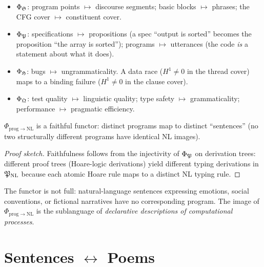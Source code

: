\begin{construction}
\label{con:prog-nl}
\begin{itemize}[nosep]
  \item $\Phi_{\mathfrak{S}}$: program points $\mapsto$ discourse segments;
    basic blocks $\mapsto$ phrases; the CFG cover $\mapsto$ constituent
    cover.
  \item $\Phi_{\mathfrak{P}}$: specifications $\mapsto$ propositions
    (a spec ``output is sorted'' becomes the proposition ``the
    array is sorted''); programs $\mapsto$ utterances (the code
    \emph{is} a statement about what it does).
  \item $\Phi_{\mathfrak{H}}$: bugs $\mapsto$ ungrammaticality.
    A data race ($H^1\neq 0$ in the thread cover) maps to a
    binding failure ($H^1\neq 0$ in the clause cover).
  \item $\Phi_{\mathfrak{Q}}$: test quality $\mapsto$ linguistic quality;
    type safety $\mapsto$ grammaticality;
    performance $\mapsto$ pragmatic efficiency.
\end{itemize}
\end{construction}

\begin{theorem}[Faithfulness]
\label{thm:prog-nl-faithful}
$\Phi_{\mathrm{prog}\to\mathrm{NL}}$ is a faithful functor:
distinct programs map to distinct ``sentences'' (no two
structurally different programs have identical NL images).
\end{theorem}

\begin{proof}[Proof sketch]
Faithfulness follows from the injectivity of $\Phi_{\mathfrak{P}}$ on
derivation trees: different proof trees (Hoare-logic derivations)
yield different typing derivations in $\mathfrak{P}_{\mathrm{NL}}$
because each atomic Hoare rule maps to a distinct NL typing
rule.
\end{proof}

\begin{remark}
The functor is not full: natural-language sentences expressing
emotions, social conventions, or fictional narratives have no
corresponding program.  The image of $\Phi_{\mathrm{prog}\to\mathrm{NL}}$
is the sublanguage of \emph{declarative descriptions of
computational processes}.
\end{remark}

\section{Sentences $\leftrightarrow$ Poems}
\label{sec:nl-poet}


